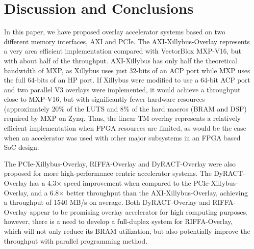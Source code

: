 \section{Discussion and Conclusions}
In this paper, we have proposed overlay accelerator systems based on two different memory interfaces, AXI and PCIe. 
The AXI-Xillybus-Overlay represents a very area efficient implementation compared with VectorBlox MXP-V16, but with about half of the throughput. 
AXI-Xillybus has only half the theoretical bandwidth of MXP, as Xillybus uses just 32-bits of an ACP port while MXP uses the full 64-bits of an HP port. 
If Xillybus were modified to use a 64-bit ACP port and two parallel V3 overlays were implemented, it would achieve a throughput close to MXP-V16, but with significantly fewer hardware resources (approximately 20\% of the LUTS and 8\% of the hard macros (BRAM and DSP) required by MXP on Zynq.
Thus, the linear TM overlay represents a relatively efficient implementation when FPGA resources are limited, as would be the case when an accelerator was used with other major subsystems in an FPGA based SoC design.

The PCIe-Xillybus-Overlay, RIFFA-Overlay and DyRACT-Overlay were also proposed for more high-performance centric accelerator systems. 
The DyRACT-Overlay has a 4.3$\times$ speed improvement when compared to the PCIe-Xillybus-Overlay, and a 6.8$\times$ better throughput than the AXI-Xillybus-Overlay, achieving a throughput of 1540 MB/s on average. 
Both DyRACT-Overlay and RIFFA-Overlay appear to be promising overlay accelerator for high computing purposes, however, there is a need to develop a full-duplex system for RIFFA-Overlay, which will not only reduce its BRAM utilization, but also potentially improve the throughput with parallel programming method. 

